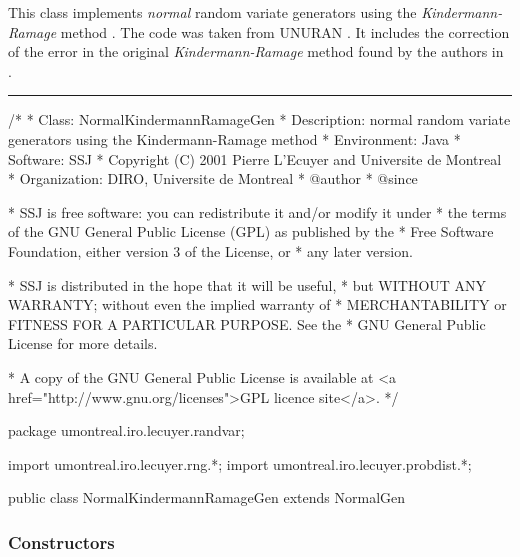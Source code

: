 
This class implements {\em normal\/} random variate generators using
 the {\em Kindermann-Ramage\/} method \cite{rKIN76a}.
The code was taken from UNURAN \cite{iLEY02a}. It includes the correction
of the error in the original {\em Kindermann-Ramage\/} method found by the
authors in \cite{rTIR04a}.


\bigskip\hrule

\begin{code}
\begin{hide}
/*
 * Class:        NormalKindermannRamageGen
 * Description:  normal random variate generators using the Kindermann-Ramage method
 * Environment:  Java
 * Software:     SSJ 
 * Copyright (C) 2001  Pierre L'Ecuyer and Universite de Montreal
 * Organization: DIRO, Universite de Montreal
 * @author       
 * @since

 * SSJ is free software: you can redistribute it and/or modify it under
 * the terms of the GNU General Public License (GPL) as published by the
 * Free Software Foundation, either version 3 of the License, or
 * any later version.

 * SSJ is distributed in the hope that it will be useful,
 * but WITHOUT ANY WARRANTY; without even the implied warranty of
 * MERCHANTABILITY or FITNESS FOR A PARTICULAR PURPOSE.  See the
 * GNU General Public License for more details.

 * A copy of the GNU General Public License is available at
   <a href="http://www.gnu.org/licenses">GPL licence site</a>.
 */
\end{hide}
package umontreal.iro.lecuyer.randvar;\begin{hide}
import umontreal.iro.lecuyer.rng.*;
import umontreal.iro.lecuyer.probdist.*;
\end{hide}

public class NormalKindermannRamageGen extends NormalGen \begin{hide} {

\end{hide}\end{code}

\subsubsection* {Constructors}

